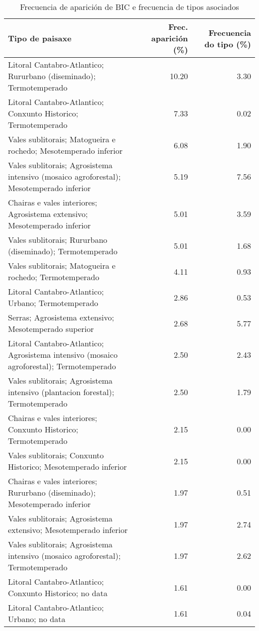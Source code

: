 \begin{table}[p]
\centering
\caption{Frecuencia de aparición de BIC e frecuencia de tipos asociados} 
\label{vbic}
\begin{tabular}{lrr}
  \hline
Tipo de paisaxe & Frec. aparición (\%) & Frecuencia do tipo (\%) \\ 
  \hline
Litoral Cantabro-Atlantico; Rururbano (diseminado); Termotemperado & 10.20 & 3.30 \\ 
  Litoral Cantabro-Atlantico; Conxunto Historico; Termotemperado & 7.33 & 0.02 \\ 
  Vales sublitorais; Matogueira e rochedo; Mesotemperado inferior & 6.08 & 1.90 \\ 
  Vales sublitorais; Agrosistema intensivo (mosaico agroforestal); Mesotemperado inferior & 5.19 & 7.56 \\ 
  Chairas e vales interiores; Agrosistema extensivo; Mesotemperado inferior & 5.01 & 3.59 \\ 
  Vales sublitorais; Rururbano (diseminado); Termotemperado & 5.01 & 1.68 \\ 
  Vales sublitorais; Matogueira e rochedo; Termotemperado & 4.11 & 0.93 \\ 
  Litoral Cantabro-Atlantico; Urbano; Termotemperado & 2.86 & 0.53 \\ 
  Serras; Agrosistema extensivo; Mesotemperado superior & 2.68 & 5.77 \\ 
  Litoral Cantabro-Atlantico; Agrosistema intensivo (mosaico agroforestal); Termotemperado & 2.50 & 2.43 \\ 
  Vales sublitorais; Agrosistema intensivo (plantacion forestal); Termotemperado & 2.50 & 1.79 \\ 
  Chairas e vales interiores; Conxunto Historico; Termotemperado & 2.15 & 0.00 \\ 
  Vales sublitorais; Conxunto Historico; Mesotemperado inferior & 2.15 & 0.00 \\ 
  Chairas e vales interiores; Rururbano (diseminado); Mesotemperado inferior & 1.97 & 0.51 \\ 
  Vales sublitorais; Agrosistema extensivo; Mesotemperado inferior & 1.97 & 2.74 \\ 
  Vales sublitorais; Agrosistema intensivo (mosaico agroforestal); Termotemperado & 1.97 & 2.62 \\ 
  Litoral Cantabro-Atlantico; Conxunto Historico; no data & 1.61 & 0.00 \\ 
  Litoral Cantabro-Atlantico; Urbano; no data & 1.61 & 0.04 \\ 

\end{tabular}
\end{table}
